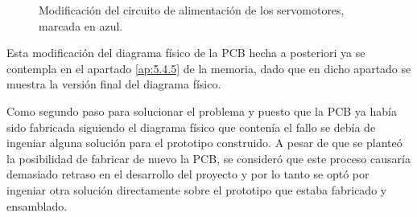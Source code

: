 \begin{itemize}
\begin{figure}[H]
    \caption{Modificación del circuito de alimentación de los servomotores, marcada en azul.}
    \end{figure}
    
    Esta modificación del diagrama físico de la \ac{PCB} hecha a posteriori ya se contempla en el apartado \ref{ap:5.4.5} de la memoria, dado que en dicho apartado se muestra la versión final del diagrama físico.
    
    Como segundo paso para solucionar el problema y puesto que la \ac{PCB} ya había sido fabricada siguiendo el diagrama físico que contenía el fallo se debía de ingeniar alguna solución para el prototipo construido. 
    A pesar de que se planteó la posibilidad de fabricar de nuevo la \ac{PCB}, se consideró que este proceso causaría demasiado retraso en el desarrollo del proyecto y por lo tanto se optó por ingeniar otra solución directamente sobre el prototipo que estaba fabricado y ensamblado.
    

\end{itemize}
